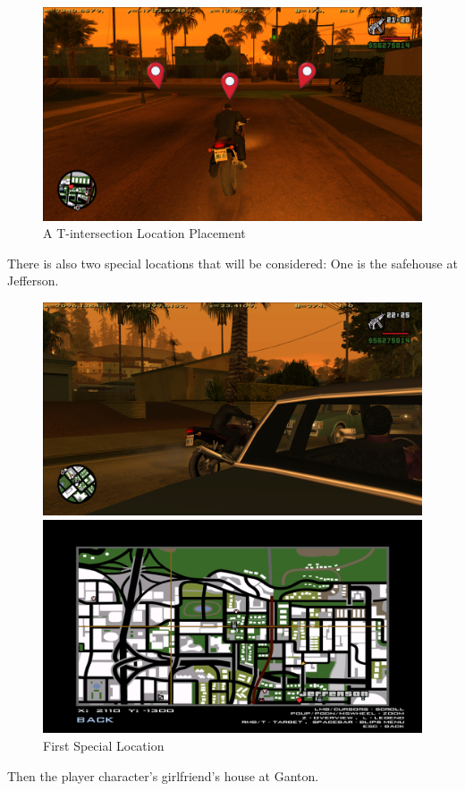 \documentclass{article}
\begin{document}
	\begin{figure}[!h]
		\centering
		\includegraphics[width=1\textwidth]{./0img/locationPlacement.png}
		\caption{A T-intersection Location Placement}
	\end{figure} There is also two special locations that will be considered: One is the safehouse at Jefferson.
	
	\begin{figure}[!h]
		\centering
		\begin{minipage}{0.49\textwidth}
			\centering
			\includegraphics[width=1\textwidth]{./0img/safehouseLocation.png}
		\end{minipage}
		\hfill
		\begin{minipage}{0.49\textwidth}
			\centering
			\includegraphics[width= 1\textwidth]{./0img/safehouseMap.png}
		\end{minipage}
		\caption{First Special Location}
	\end{figure} Then the player character's girlfriend's house at Ganton.
	
\end{document}
